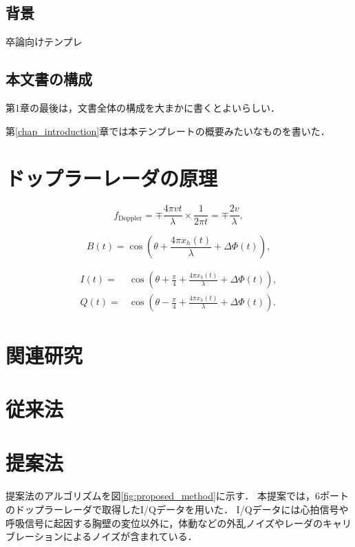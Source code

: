\section{背景}

卒論向けテンプレ

\section{本文書の構成}

第1章の最後は，文書全体の構成を大まかに書くとよいらしい．

第\ref{chap_introduction}章では本テンプレートの概要みたいなものを書いた．



\chapter{ドップラーレーダの原理}
\begin{equation*} f_{\mathrm{ Doppler}} = \mp \frac {4 \pi vt}{\lambda } \times \frac {1}{2 \pi t} = \mp \frac {2v}{\lambda },\tag{1}\end{equation*}

\begin{equation*} B(t)=\cos \left({\theta +\frac {4\pi x_{h}(t)}{\lambda }+\Delta \Phi (t)}\right),\tag{2}\end{equation*}

\begin{align*} I(t)=&\cos \left({\theta +\frac {\pi }{4}+\frac {4\pi x_{h}(t)}{\lambda }+\Delta \Phi (t)}\right), \tag{3}\\ Q(t)=&\cos \left({\theta -\frac {\pi }{4}+\frac {4\pi x_{h}(t)}{\lambda }+\Delta \Phi (t)}\right).\tag{4}\end{align*}

\chapter{関連研究}

\chapter{従来法}

\chapter{提案法}
提案法のアルゴリズムを図\ref{fig:proposed_method}に示す．
本提案では，6ポートのドップラーレーダで取得したI/Qデータを用いた．
I/Qデータには心拍信号や呼吸信号に起因する胸壁の変位以外に，体動などの外乱ノイズやレーダのキャリブレーションによるノイズが含まれている．

